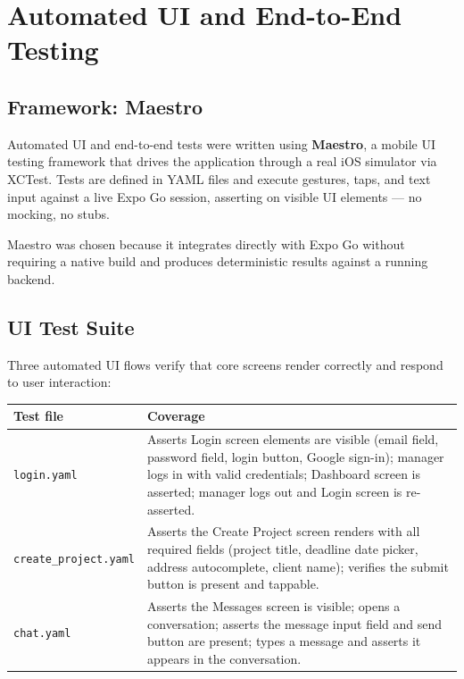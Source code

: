 \documentclass[12pt,a4paper]{article}
\begin{document}
\section{Automated UI and End-to-End Testing}

\subsection{Framework: Maestro}

Automated UI and end-to-end tests were written using \textbf{Maestro}, a mobile UI testing framework that drives the application through a real iOS simulator via XCTest. Tests are defined in YAML files and execute gestures, taps, and text input against a live Expo Go session, asserting on visible UI elements --- no mocking, no stubs.

Maestro was chosen because it integrates directly with Expo Go without requiring a native build and produces deterministic results against a running backend.

\subsection{UI Test Suite}

Three automated UI flows verify that core screens render correctly and respond to user interaction:

\begin{tabularx}{\textwidth}{|l|X|}
\hline
\textbf{Test file} & \textbf{Coverage} \\
\hline
\texttt{login.yaml} &
  Asserts Login screen elements are visible (email field, password field, login button, Google sign-in); manager logs in with valid credentials; Dashboard screen is asserted; manager logs out and Login screen is re-asserted. \\
\hline
\texttt{create\_project.yaml} &
  Asserts the Create Project screen renders with all required fields (project title, deadline date picker, address autocomplete, client name); verifies the submit button is present and tappable. \\
\hline
\texttt{chat.yaml} &
  Asserts the Messages screen is visible; opens a conversation; asserts the message input field and send button are present; types a message and asserts it appears in the conversation. \\
\hline
\end{tabularx}
\end{document}
